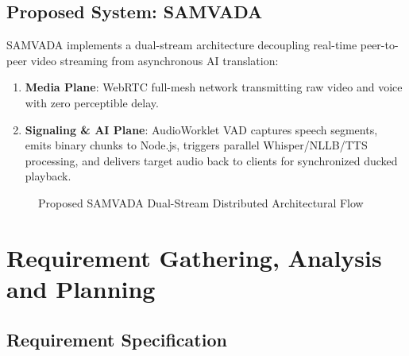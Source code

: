 \documentclass[12pt,a4paper]{report}
\begin{document}
\section{Proposed System: SAMVADA}
SAMVADA implements a dual-stream architecture decoupling real-time peer-to-peer video streaming from asynchronous AI translation:
\begin{enumerate}
    \item \textbf{Media Plane}: WebRTC full-mesh network transmitting raw video and voice with zero perceptible delay.
    \item \textbf{Signaling \& AI Plane}: AudioWorklet VAD captures speech segments, emits binary chunks to Node.js, triggers parallel Whisper/NLLB/TTS processing, and delivers target audio back to clients for synchronized ducked playback.
\end{enumerate}

\begin{figure}[H]
  \centering
  \caption{Proposed SAMVADA Dual-Stream Distributed Architectural Flow}
  \label{fig:fig2_2}
\end{figure}

\chapter{Requirement Gathering, Analysis and Planning}

\section{Requirement Specification}
\end{document}
